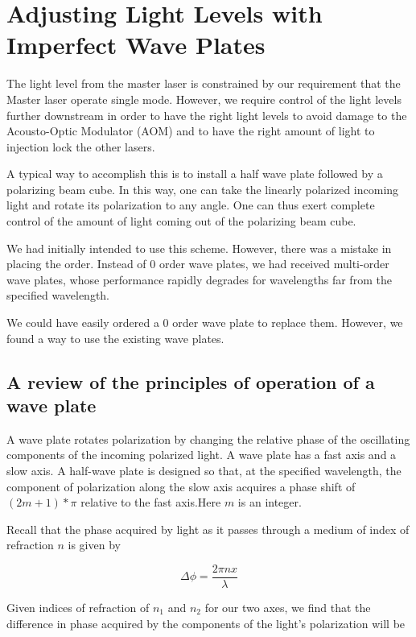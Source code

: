 \chapter{Adjusting Light Levels with Imperfect Wave Plates}
\label{twoWaveplateTrick}

The light level from the master laser is constrained by our requirement that the Master laser operate single mode. However, we require control of the light levels further downstream in order to have the right light levels to avoid damage to the Acousto-Optic Modulator (AOM) and to have the right amount of light to injection lock the other lasers. 

A typical way to accomplish this is to install a half wave plate followed by a polarizing beam cube. In this way, one can take the linearly polarized incoming light and rotate its polarization to any angle. One can thus exert complete control of the amount of light coming out of the polarizing beam cube. 

We had initially intended to use this scheme. However, there was a mistake in placing the order. Instead of 0 order wave plates, we had received multi-order wave plates, whose performance rapidly degrades for wavelengths far from the specified wavelength. 

We could have easily ordered a 0 order wave plate to replace them. However, we found a way to use the existing wave plates.

\section{A review of the principles of operation of a wave plate}

A wave plate rotates polarization by changing the relative phase of the oscillating components of the incoming polarized light. A wave plate has a fast axis and a slow axis. A half-wave plate is designed so that, at the specified wavelength, the component of polarization along the slow axis acquires a phase shift of $(2m+1)*\pi$ relative to the fast axis.Here $m$ is an integer. 

Recall that the phase acquired by light as it passes through a medium of index of refraction $n$ is given by 

\begin{equation}
  \Delta \phi = \frac{2 \pi n x}{\lambda} \label{deltaPhi0}
\end{equation}

Given indices of refraction of $n_1$ and $n_2$ for our two axes, we find that the difference in phase acquired by the components of the light's polarization will be 

